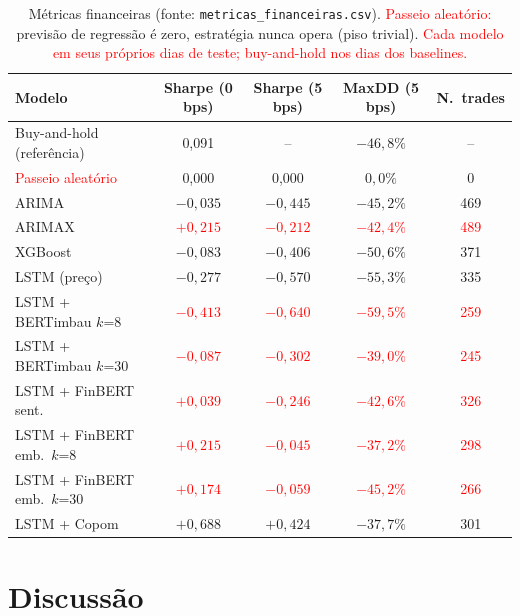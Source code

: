 \documentclass[conference]{IEEEtran}
\newcommand{\novo}[1]{\textcolor{red}{#1}}
\begin{document}
\begin{table}[htbp]
\caption{M\'etricas financeiras (fonte: \texttt{metricas\_financeiras.csv}). \novo{Passeio aleat\'orio:} previs\~ao de regress\~ao \'e zero, estrat\'egia nunca opera (piso trivial). \novo{Cada modelo em seus pr\'oprios dias de teste; buy-and-hold nos dias dos baselines.}}
\begin{center}
\footnotesize
\begin{tabular}{lcccc}
\toprule
\textbf{Modelo} & \textbf{Sharpe (0 bps)} & \textbf{Sharpe (5 bps)} & \textbf{MaxDD (5 bps)} & \textbf{N.\ trades} \\
\midrule
Buy-and-hold (refer\^encia) & 0,091 & --      & $-46{,}8\%$ & -- \\
\novo{Passeio aleat\'orio} & 0,000 & 0,000   & $0{,}0\%$   & 0 \\
ARIMA                      & $-0{,}035$ & $-0{,}445$ & $-45{,}2\%$ & 469 \\
ARIMAX & \novo{$+0{,}215$} & \novo{$-0{,}212$} & \novo{$-42{,}4\%$} & \novo{489} \\
XGBoost                    & $-0{,}083$ & $-0{,}406$ & $-50{,}6\%$ & 371 \\
LSTM (pre\c{c}o)           & $-0{,}277$ & $-0{,}570$ & $-55{,}3\%$ & 335 \\
LSTM + BERTimbau $k$=8 & \novo{$-0{,}413$} & \novo{$-0{,}640$} & \novo{$-59{,}5\%$} & \novo{259} \\
LSTM + BERTimbau $k$=30 & \novo{$-0{,}087$} & \novo{$-0{,}302$} & \novo{$-39{,}0\%$} & \novo{245} \\
LSTM + FinBERT sent. & \novo{$+0{,}039$} & \novo{$-0{,}246$} & \novo{$-42{,}6\%$} & \novo{326} \\
LSTM + FinBERT emb.\ $k$=8 & \novo{$+0{,}215$} & \novo{$-0{,}045$} & \novo{$-37{,}2\%$} & \novo{298} \\
LSTM + FinBERT emb.\ $k$=30 & \novo{$+0{,}174$} & \novo{$-0{,}059$} & \novo{$-45{,}2\%$} & \novo{266} \\
LSTM + Copom                & $+0{,}688$ & $+0{,}424$ & $-37{,}7\%$ & 301 \\
\bottomrule
\end{tabular}
\label{tab:financeiro}
\end{center}
\end{table}

\section{Discuss\~ao}
\end{document}
